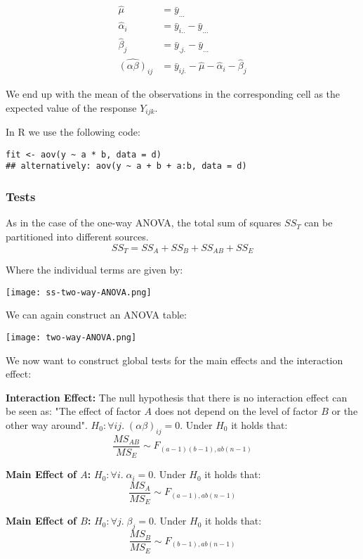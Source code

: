 \begin{align*}
	\hat \mu &= \bar y_{...} \\
	\hat \alpha_i &= \bar y_{i..} - \bar y_{...} \\
	\hat \beta_j &= \bar y_{.j.} - \bar y_{...} \\
	\widehat {(\alpha \beta)}_{ij} &= \bar y_{ij.} - \hat \mu - \hat \alpha_i - \hat \beta_j
\end{align*}

We end up with the mean of the observations in the corresponding cell as the expected value of the response $Y_{ijk}$.\medskip

In R we use the following code:
\begin{lstlisting}
fit <- aov(y ~ a * b, data = d) 
## alternatively: aov(y ~ a + b + a:b, data = d)
\end{lstlisting}

\subsubsection{Tests}

As in the case of the one-way ANOVA, the total sum of squares $SS_T$ can be partitioned into different sources.
$$SS_T = SS_A + SS_B + SS_{AB} + SS_E$$

Where the individual terms are given by:
\begin{center}
	\texttt{[image: ss-two-way-ANOVA.png]}
\end{center}

We can again construct an ANOVA table:

\begin{center}
	\texttt{[image: two-way-ANOVA.png]}
\end{center}

We now want to construct global tests for the main effects and the interaction effect: \medskip

\textbf{Interaction Effect:} The null hypothesis that there is no interaction effect can be seen as: "The effect of factor $A$ does not depend on the level of factor $B$ or the other way around". $H_0: \forall ij. \; (\alpha \beta)_{ij} = 0$. Under $H_0$ it holds that:
$$\frac{MS_{AB}}{MS_E} \sim F_{(a-1)(b-1),ab(n-1)}$$

\textbf{Main Effect of $A$:} $H_0: \forall i. \; \alpha_i = 0$. Under $H_0$ it holds that:
$$\frac{MS_{A}}{MS_E} \sim F_{(a-1), ab(n-1)}$$
 
\textbf{Main Effect of $B$:} $H_0: \forall j. \; \beta_j = 0$. Under $H_0$ it holds that:
$$\frac{MS_{B}}{MS_E} \sim F_{(b-1), ab(n-1)}$$

